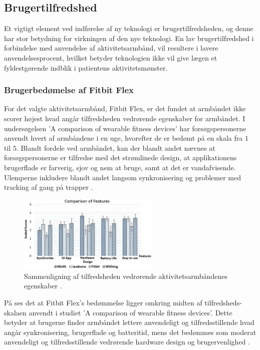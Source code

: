 \subsection{Brugertilfredshed}

Et vigtigt element ved indførelse af ny teknologi er brugertilfredsheden, og denne har stor betydning for virkningen af den nye teknologi. En lav brugertilfredshed i forbindelse med anvendelse af aktivitetsarmbånd, vil resultere i lavere anvendelsesprocent, hvilket betyder teknologien ikke vil give lægen et fyldestgørende indblik i patientens aktivitetsmønster.

\subsubsection{Brugerbedømelse af Fitbit Flex}

For det valgte aktivitetsarmbånd, Fitbit Flex, er det fundet at armbåndet ikke scorer højest hvad angår tilfredsheden vedrørende egenskaber for armbåndet. I undersøgelsen 'A comparison of wearable fitness devices' har forsøgspersonerne anvendt hvert af armbåndene i en uge, hvorefter de er bedømt på en skala fra $1$ til $5$. Blandt fordele ved armbåndet, kan der blandt andet nævnes at forsøgspersonerne er tilfredse med det strømlinede design, at applikationens brugerflade er farverig, sjov og nem at bruge, samt at det er vandafvisende. Ulemperne inkludere blandt andet langsom synkronisering og problemer med tracking af gang på trapper \citep{kaewkannate2016}.

\begin{figure}[H]
	\centering
	\includegraphics[width=0.6\textwidth]{figures/FeatureSatisfaction}
	\caption{Sammenligning af tilfredsheden vedrørende aktivitetsarmbåndenes egenskaber \citep{kaewkannate2016}.}
	\label{fig:FeatureSatisfaction}
\end{figure}

På  ses det at Fitbit Flex's bedømmelse ligger omkring midten af tilfredsheds-skalaen anvendt i studiet 'A comparison of wearable fitness devices'. Dette betyder at brugerne finder armbåndet lettere anvendeligt og tilfredsstillende hvad angår synkronisering, brugerflade og batteritid, mens det bedømmes som moderat anvendeligt og tilfredsstillende vedrørende hardware design og brugervenlighed \citep{kaewkannate2016}.

